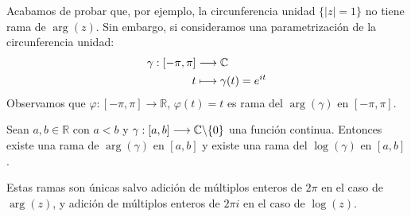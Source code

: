 \begin{obs}
    Acabamos de probar que, por ejemplo, la circunferencia unidad $\{ |z| = 1 \}$ no tiene rama de $\arg(z)$. Sin embargo, si consideramos una parametrización de la circunferencia unidad:
    \begin{align*}
        \gamma : [-\pi, \pi] & \longrightarrow \mathbb{C}           \\
        t                    & \longmapsto \gamma(t) = e^{it}
    \end{align*}
    Observamos que $\varphi : [-\pi, \pi] \longrightarrow \mathbb{R}$, $\varphi(t) = t$ es rama del $\arg(\gamma)$ en $[-\pi,\pi]$.
\end{obs}

\begin{teo}
    Sean $a,b \in \mathbb{R}$ con $a < b$ y $\gamma : [a,b] \longrightarrow \mathbb{C} \backslash \{0\}$ una función continua. Entonces existe una rama de $\arg(\gamma)$ en $[a,b]$ y existe una rama del $\log(\gamma)$ en $[a,b]$.

    Estas ramas son únicas salvo adición de múltiplos enteros de $2\pi$ en el caso de $\arg(z)$, y adición de múltiplos enteros de $2\pi i$ en el caso de $\log(z)$.
\end{teo}


